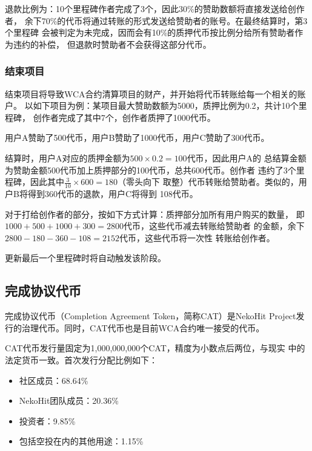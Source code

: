 \documentclass[11pt,UTF8,a4paper]{ctexart}
\begin{document}
    退款比例为：10个里程碑作者完成了3个，因此30\%的赞助数额将直接发送给创作者，
    余下70\%的代币将通过转账的形式发送给赞助者的账号。在最终结算时，第3个里程碑
    会被判定为未完成，因而会有10\%的质押代币按比例分给所有赞助者作为违约的补偿，
    但退款时赞助者不会获得这部分代币。

    \subsubsection{结束项目}

    结束项目将导致WCA合约清算项目的财产，并开始将代币转账给每一个相关的账户。
    以如下项目为例：某项目最大赞助数额为5000，质押比例为0.2，共计10个里程碑，
    创作者完成了其中7个，创作者质押了1000代币。

    用户A赞助了500代币，用户B赞助了1000代币，用户C赞助了300代币。

    结算时，用户A对应的质押金额为$500 \times 0.2 = 100$代币，因此用户A的
    总结算金额为赞助金额500代币加上质押部分的100代币，总共600代币。创作者
    违约了3个里程碑，因此其中$\frac{3}{10} \times 600 = 180$（零头向下
    取整）代币转账给赞助者。类似的，用户B将得到360代币的退款，用户C将得到
    108代币。

    对于打给创作者的部分，按如下方式计算：质押部分加所有用户购买的数量，
    即$1000 + 500 + 1000 + 300 = 2800$代币，这些代币减去转账给赞助者
    的金额，余下$2800 - 180 - 360 - 108 = 2152$代币，这些代币将一次性
    转账给创作者。

    更新最后一个里程碑时将自动触发该阶段。

    \subsection{完成协议代币}\label{subsec:cat}

    完成协议代币（Completion Agreement Token，简称CAT）是NekoHit
    Project发行的治理代币。同时，CAT代币也是目前WCA合约唯一接受的代币。

    CAT代币发行量固定为1,000,000,000个CAT，精度为小数点后两位，与现实
    中的法定货币一致。首次发行分配比例如下：

    \begin{itemize}
        \item 社区成员：68.64\%
        \item NekoHit团队成员：20.36\%
        \item 投资者：9.85\%
        \item 包括空投在内的其他用途：1.15\%
    \end{itemize}
\end{document}
